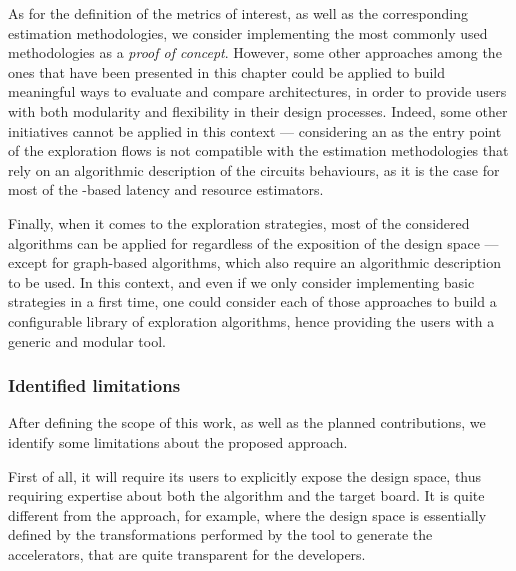         As for the definition of the metrics of interest, as well as the corresponding estimation methodologies, we consider implementing the most commonly used methodologies as a {\it proof of concept}.
        However, some other approaches among the ones that have been presented in this chapter could be applied to build meaningful ways to evaluate and compare architectures, in order to provide users with both modularity and flexibility in their design processes.
        Indeed, some other initiatives cannot be applied in this context --- \eg considering an  as the entry point of the exploration flows is not compatible with the estimation methodologies that rely on an algorithmic description of the circuits behaviours, as it is the case for most of the -based latency and resource estimators.

        Finally, when it comes to the exploration strategies, most of the considered algorithms can be applied for  regardless of the exposition of the design space --- except for graph-based algorithms, which also require an algorithmic description to be used.
        In this context, and even if we only consider implementing basic strategies in a first time, one could consider each of those approaches to build a configurable library of exploration algorithms, hence providing the users with a generic and modular tool.

\clearpage
    \subsubsection{Identified limitations}

        After defining the scope of this work, as well as the planned contributions, we identify some limitations about the proposed approach.

        First of all, it will require its users to explicitly expose the design space, thus requiring expertise about both the algorithm and the target board.
        It is quite different from the  approach, for example, where the design space is essentially defined by the transformations performed by the  tool to generate the accelerators, that are quite transparent for the developers.

